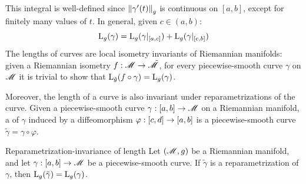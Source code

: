 This integral is well-defined since $ \left\lVert\gamma'(t)\right\rVert_g $ is continuous on $ [a,b] $, except for finitely many values of $ t $. In general, given $ c \in (a,b) $:
\begin{equation}
  \mathrm{L}_g(\gamma) = \mathrm{L}_g(\gamma \vert_{[a,c]}) + \mathrm{L}_g(\gamma \vert_{[c,b]})
\end{equation}
The lengths of curves are local isometry invariants of Riemannian manifolds: given a Riemannian isometry $ f : \mathscr{M} \rightarrow \tilde{\mathscr{M}} $, for every piecewise-smooth curve $ \gamma $ on $ \mathscr{M} $ it is trivial to show that $ \mathrm{L}_{\tilde{g}}(f \circ \gamma) = \mathrm{L}_g(\gamma) $.

Moreover, the length of a curve is also invariant under reparametrizations of the curve. Given a piecewise-smooth curve $ \gamma : [a,b] \rightarrow \mathscr{M} $ on a Riemannian manifold, a  of $ \gamma $ induced by a diffeomorphism $ \varphi : [c,d] \rightarrow [a,b] $ is a piecewise-smooth curve $ \tilde{\gamma} = \gamma \circ \varphi $.

\begin{proposition}{Reparametrization-invariance of length}{}
  Let $ (\mathscr{M},g) $ be a Riemannian manifold, and let $ \gamma : [a,b] \rightarrow \mathscr{M} $ be a piecewise-smooth curve. If $ \tilde{\gamma} $ is a reparametrization of $ \gamma $, then $ \mathrm{L}_g(\tilde{\gamma}) = \mathrm{L}_g(\gamma) $.
\end{proposition}

